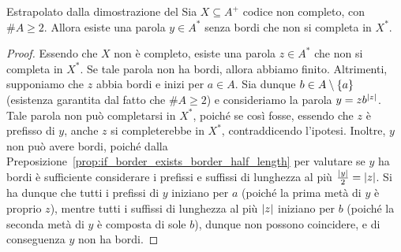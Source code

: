 \begin{lemma}[label=lem:code_not_complete_boredless_word]{\infosymbol{} Estrapolato dalla dimostrazione del }
  Sia \(X \subseteq A^+\) codice non completo, con \(\# A \geq 2\).
  Allora esiste una parola \(y \in A^*\) senza bordi che non si completa in \(X^*\).
\end{lemma}
\begin{proof}
  Essendo che \(X\) non è completo, esiste una parola \(z \in A^*\) che non si completa in \(X^*\).
  Se tale parola non ha bordi, allora abbiamo finito.
  Altrimenti, supponiamo che \(z\) abbia bordi e inizi per \(a \in A\).
  Sia dunque \(b \in A\setminus\set{a}\) (esistenza garantita dal fatto che \(\# A \geq 2\)) e consideriamo la parola \(y = zb^{\left|z\right|}\).
  Tale parola non può completarsi in \(X^*\), poiché se così fosse, essendo che \(z\) è prefisso di \(y\), anche \(z\) si completerebbe in \(X^*\), contraddicendo l'ipotesi.
  Inoltre, \(y\) non può avere bordi, poiché dalla Preposizione~\ref{prop:if_border_exists_border_half_length} per valutare se \(y\) ha bordi è sufficiente considerare i prefissi e suffissi di lunghezza al più \(\frac{\left|y\right|}{2} = \left|z\right|\).
  Si ha dunque che tutti i prefissi di \(y\) iniziano per \(a\) (poiché la prima metà di \(y\) è proprio \(z\)), mentre tutti i suffissi di lunghezza al più \(\left|z\right|\) iniziano per \(b\) (poiché la seconda metà di \(y\) è composta di sole \(b\)), dunque non possono coincidere, e di conseguenza \(y\) non ha bordi.
\end{proof}

